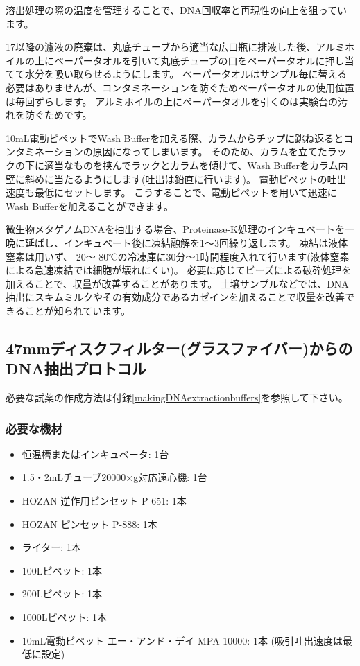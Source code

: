 \documentclass[titlepage,10pt,a4paper,uplatex]{jsbook}
\begin{document}
溶出処理の際の温度を管理することで、DNA回収率と再現性の向上を狙っています。

17以降の濾液の廃棄は、丸底チューブから適当な広口瓶に排液した後、アルミホイルの上にペーパータオルを引いて丸底チューブの口をペーパータオルに押し当てて水分を吸い取らせるようにします。
ペーパータオルはサンプル毎に替える必要はありませんが、コンタミネーションを防ぐためペーパータオルの使用位置は毎回ずらします。
アルミホイルの上にペーパータオルを引くのは実験台の汚れを防ぐためです。

10mL電動ピペットでWash Bufferを加える際、カラムからチップに跳ね返るとコンタミネーションの原因になってしまいます。
そのため、カラムを立てたラックの下に適当なものを挟んでラックとカラムを傾けて、Wash Bufferをカラム内壁に斜めに当たるようにします(吐出は鉛直に行います)。
電動ピペットの吐出速度も最低にセットします。
こうすることで、電動ピペットを用いて迅速にWash Bufferを加えることができます。

微生物メタゲノムDNAを抽出する場合、Proteinase-K処理のインキュベートを一晩に延ばし、インキュベート後に凍結融解を1～3回繰り返します。
凍結は液体窒素は用いず、{-20}～{-80}℃の冷凍庫に30分～1時間程度入れて行います(液体窒素による急速凍結では細胞が壊れにくい)。
必要に応じてビーズによる破砕処理を加えることで、収量が改善することがあります。
土壌サンプルなどでは、DNA抽出にスキムミルクやその有効成分であるカゼインを加えることで収量を改善できることが知られています\citep{Takada-Hoshino2004,Wang2012}。

\subsection{47mmディスクフィルター(グラスファイバー)からのDNA抽出プロトコル}

必要な試薬の作成方法は付録\ref{makingDNAextractionbuffers}を参照して下さい。

\subsubsection{必要な機材}
\begin{itemize}
\item 恒温槽またはインキュベータ: 1台
\item 1.5・2mLチューブ20000×g対応遠心機: 1台
\item HOZAN 逆作用ピンセット P-651: 1本
\item HOZAN ピンセット P-888: 1本
\item ライター: 1本
\item 100{\textmu}Lピペット: 1本
\item 200{\textmu}Lピペット: 1本
\item 1000{\textmu}Lピペット: 1本
\item 10mL電動ピペット エー・アンド・デイ MPA-10000: 1本 (吸引吐出速度は最低に設定)
\end{itemize}
\end{document}
